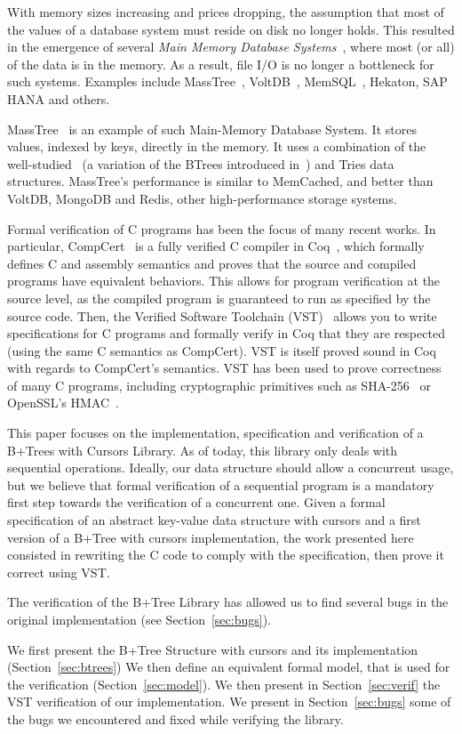   With memory sizes increasing and prices dropping, the assumption that most of the values of a database system must reside on disk no longer holds.
  This resulted in the emergence of several \textit{Main Memory Database Systems}~\cite{mmdb}, where most (or all) of the data is in the memory.
  As a result, file I/O is no longer a bottleneck for such systems.
  Examples include MassTree~\cite{masstree}, VoltDB~\cite{voltdb}, MemSQL~\cite{memsql}, Hekaton, SAP HANA and others.

  MassTree~\cite{masstree} is an example of such Main-Memory Database System.
  It stores values, indexed by keys, directly in the memory.
  It uses a combination of the well-studied \btrees\ (a variation of the BTrees introduced in~\cite{btrees}) and Tries data structures.
  MassTree's performance is similar to MemCached, and better than VoltDB, MongoDB and Redis, other high-performance storage systems.

  Formal verification of C programs has been the focus of many recent works.
  In particular, CompCert~\cite{compcert,compcert2} is a fully verified C compiler in Coq~\cite{coq}, which formally defines C and assembly semantics and proves that the source and compiled programs have equivalent behaviors.
  This allows for program verification at the source level, as the compiled program is guaranteed to run as specified by the source code.
  Then, the Verified Software Toolchain (VST)~\cite{vst} allows you to write specifications for C programs and formally verify in Coq that they are respected (using the same C semantics as CompCert).
  VST is itself proved sound in Coq with regards to CompCert's semantics.
  VST has been used to prove correctness of many C programs, including cryptographic primitives such as SHA-256~\cite{sha} or OpenSSL's HMAC~\cite{hmac}.

  This paper focuses on the implementation, specification and verification of a B+Trees with Cursors Library.
  As of today, this library only deals with sequential operations.
  Ideally, our data structure should allow a concurrent usage, but we believe that formal verification of a sequential program is a mandatory first step towards the verification of a concurrent one.
  Given a formal specification of an abstract key-value data structure with cursors and a first version of a B+Tree with cursors implementation, the work presented here consisted in rewriting the C code to comply with the specification, then prove it correct using VST.

  The verification of the B+Tree Library has allowed us to find several bugs in the original implementation (see Section~\ref{sec:bugs}).

  We first present the B+Tree Structure with cursors and its implementation (Section~\ref{sec:btrees})
  We then define an equivalent formal model, that is used for the verification (Section~\ref{sec:model}).
  We then present in Section~\ref{sec:verif} the VST verification of our implementation.
  We present in Section~\ref{sec:bugs} some of the bugs we encountered and fixed while verifying the library.

